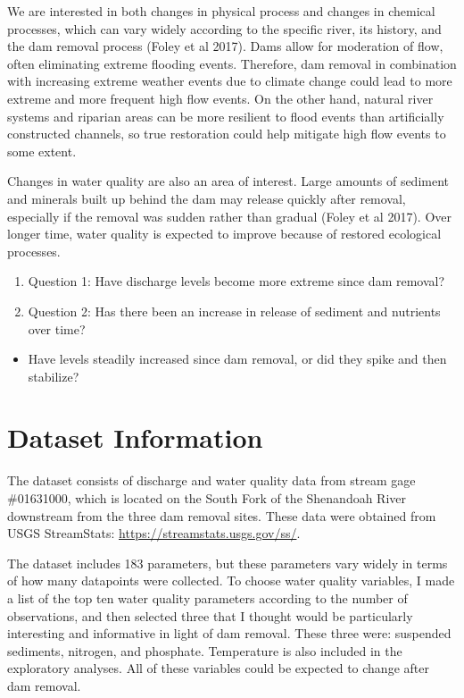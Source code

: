 \documentclass[
  12pt,
]{article}
\providecommand{\tightlist}{%
  \setlength{\itemsep}{0pt}\setlength{\parskip}{0pt}}
\begin{document}
We are interested in both changes in physical process and changes in
chemical processes, which can vary widely according to the specific
river, its history, and the dam removal process (Foley et al 2017). Dams
allow for moderation of flow, often eliminating extreme flooding events.
Therefore, dam removal in combination with increasing extreme weather
events due to climate change could lead to more extreme and more
frequent high flow events. On the other hand, natural river systems and
riparian areas can be more resilient to flood events than artificially
constructed channels, so true restoration could help mitigate high flow
events to some extent.

Changes in water quality are also an area of interest. Large amounts of
sediment and minerals built up behind the dam may release quickly after
removal, especially if the removal was sudden rather than gradual (Foley
et al 2017). Over longer time, water quality is expected to improve
because of restored ecological processes.

\begin{enumerate}
\def\labelenumi{\arabic{enumi}.}
\item
  Question 1: Have discharge levels become more extreme since dam
  removal?
\item
  Question 2: Has there been an increase in release of sediment and
  nutrients over time?
\end{enumerate}

\begin{itemize}
\tightlist
\item
  Have levels steadily increased since dam removal, or did they spike
  and then stabilize?
\end{itemize}

\newpage

\hypertarget{dataset-information}{%
\section{Dataset Information}\label{dataset-information}}

The dataset consists of discharge and water quality data from stream
gage \#01631000, which is located on the South Fork of the Shenandoah
River downstream from the three dam removal sites. These data were
obtained from USGS StreamStats: \url{https://streamstats.usgs.gov/ss/}.

The dataset includes 183 parameters, but these parameters vary widely in
terms of how many datapoints were collected. To choose water quality
variables, I made a list of the top ten water quality parameters
according to the number of observations, and then selected three that I
thought would be particularly interesting and informative in light of
dam removal. These three were: suspended sediments, nitrogen, and
phosphate. Temperature is also included in the exploratory analyses. All
of these variables could be expected to change after dam removal.
\end{document}

